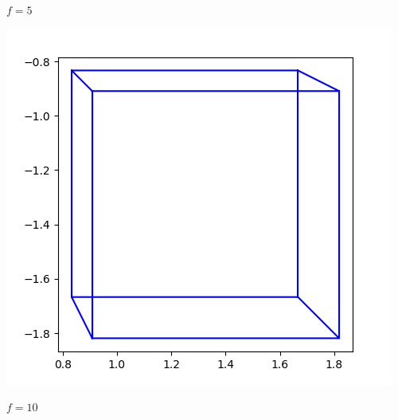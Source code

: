 \documentclass[11pt,class=report,crop=false]{standalone}
\begin{document}
\begin{activite}[Perspective]
\begin{enumerate}
\begin{center}
\begin{minipage}{0.2\textwidth}
\begin{center}
		$f=5$
	\end{center}
	\end{minipage}
	\begin{minipage}{0.2\textwidth}
	\begin{center}
		\includegraphics[scale=\myscale,scale=0.25]{ecran-perspective-6-10}
		
		$f=10$
	\end{center}
	\end{minipage}
	\end{center}	
		  
\end{enumerate}
	
\end{activite}


\end{document}
